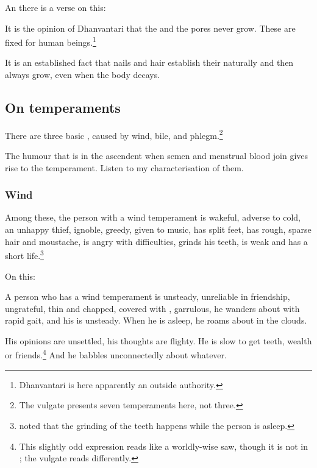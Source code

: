 \begin{translation}
\item[60]

An there is a verse on this:
\begin{sloka}
     It is  the opinion of Dhanvantari that
     the  and the pores never grow.
     These are fixed for human beings.\footnote{Dhanvantari is here apparently 
     an outside authority.}
\end{sloka}

\item[61]

It is an established fact that nails and hair establish their 
naturally and then always grow, even when the body decays.


\subsection{On temperaments}

\item[62]

There are three basic , caused by wind,
bile, and phlegm.\footnote{The vulgate presents seven temperaments
    here, not three.}

\item[63] 

The humour that is in the ascendent when semen and menstrual blood join 
gives rise to the temperament.  Listen to my characterisation of them.


\subsubsection{Wind}

\item[64]

Among these, the person with a wind temperament is wakeful, adverse to
cold, an unhappy thief, ignoble, greedy, given to music, has split
feet, has rough, sparse hair and moustache, is angry with
difficulties, grinds his teeth, is weak and has a short
life.\footnote{ noted that the grinding of the
    teeth happens while the person is asleep.}
 
\item [65--66]

On this:
\begin{sloka}
    A person who has a wind temperament is unsteady,  unreliable in friendship, ungrateful, thin and chapped, covered with , 
    garrulous, he wanders about with rapid gait, and his  is unsteady.  When he is asleep, he roams about in the clouds.
\end{sloka}
\begin{sloka}
    His opinions are unsettled, his thoughts are flighty.  He is
slow to get teeth, wealth or friends.\footnote{This slightly odd
    expression reads like a worldly-wise saw, though it is not in \cite{jaco-handful}; the vulgate reads
    differently.} And he babbles unconnectedly about whatever.
\end{sloka}
 

\end{translation}
